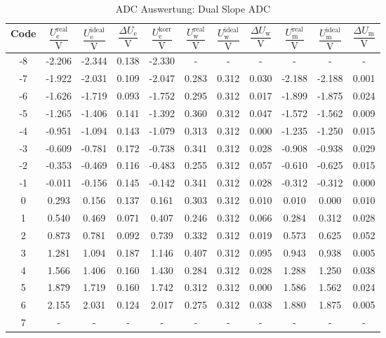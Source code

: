 \begin{table}[htbp]
\centering
\caption{ADC Auswertung: Dual Slope ADC}
\label{tab:dual_slope_adc}
\begin{tabular}{c|cccc|ccc|ccc}
Code & $\dfrac{U^\mathrm{real}_{\mathrm{e}}}{\si{\volt}}$ & $\dfrac{U^\mathrm{ideal}_{\mathrm{e}}}{\si{\volt}}$ & $\dfrac{\Delta U_{\mathrm{e}}}{\si{\volt}}$ & $\dfrac{U^\mathrm{korr}_{\mathrm{e}}}{\si{\volt}}$ & $\dfrac{U^\mathrm{real}_{\mathrm{w}}}{\si{\volt}}$ & $\dfrac{U^\mathrm{ideal}_{\mathrm{w}}}{\si{\volt}}$ & $\dfrac{\Delta U_{\mathrm{w}}}{\si{\volt}}$ & $\dfrac{U^\mathrm{real}_{\mathrm{m}}}{\si{\volt}}$ & $\dfrac{U^\mathrm{ideal}_{\mathrm{m}}}{\si{\volt}}$ & $\dfrac{\Delta U_{\mathrm{m}}}{\si{\volt}}$ \\
\midrule
-8 & -2.206 & -2.344 & {\cellcolor[HTML]{35CCFF} 0.138} & -2.330 & - & - & - & - & - & - \\
-7 & -1.922 & -2.031 & 0.109 & -2.047 & 0.283 & 0.312 & 0.030 & -2.188 & -2.188 & 0.001 \\
-6 & -1.626 & -1.719 & 0.093 & -1.752 & 0.295 & 0.312 & 0.017 & -1.899 & -1.875 & 0.024 \\
-5 & -1.265 & -1.406 & 0.141 & -1.392 & 0.360 & 0.312 & 0.047 & -1.572 & -1.562 & 0.009 \\
-4 & -0.951 & -1.094 & 0.143 & -1.079 & 0.313 & 0.312 & 0.000 & -1.235 & -1.250 & 0.015 \\
-3 & -0.609 & -0.781 & 0.172 & -0.738 & 0.341 & 0.312 & 0.028 & -0.908 & -0.938 & 0.029 \\
-2 & -0.353 & -0.469 & 0.116 & -0.483 & 0.255 & 0.312 & 0.057 & -0.610 & -0.625 & 0.015 \\
-1 & -0.011 & -0.156 & 0.145 & -0.142 & 0.341 & 0.312 & 0.028 & -0.312 & -0.312 & 0.000 \\
0 & 0.293 & 0.156 & {\cellcolor[HTML]{8FFF5B} 0.137} & 0.161 & 0.303 & 0.312 & 0.010 & 0.010 & 0.000 & 0.010 \\
1 & 0.540 & 0.469 & 0.071 & 0.407 & 0.246 & 0.312 & 0.066 & 0.284 & 0.312 & 0.028 \\
2 & 0.873 & 0.781 & 0.092 & 0.739 & 0.332 & 0.312 & 0.019 & 0.573 & 0.625 & {\cellcolor[HTML]{FF728A} 0.052} \\
3 & 1.281 & 1.094 & 0.187 & 1.146 & 0.407 & 0.312 & {\cellcolor[HTML]{FFEC21} 0.095} & 0.943 & 0.938 & 0.005 \\
4 & 1.566 & 1.406 & 0.160 & 1.430 & 0.284 & 0.312 & 0.028 & 1.288 & 1.250 & 0.038 \\
5 & 1.879 & 1.719 & 0.160 & 1.742 & 0.312 & 0.312 & 0.000 & 1.586 & 1.562 & 0.024 \\
6 & 2.155 & 2.031 & {\cellcolor[HTML]{FF8438} 0.124} & 2.017 & 0.275 & 0.312 & 0.038 & 1.880 & 1.875 & 0.005 \\
7 & - & - & - & - & - & - & - & - & - & - \\
\end{tabular}
\end{table}
